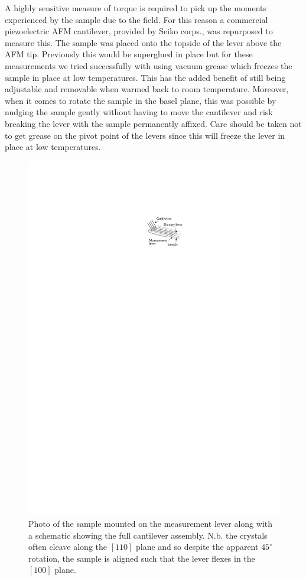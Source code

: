 A highly sensitive measure of torque is required to pick up the moments experienced by the sample due to the field. For this reason a commercial piezoelectric \ac{AFM} cantilever, provided by Seiko corps., was repurposed to measure this. The sample was placed onto the topside of the lever above the \ac{AFM} tip. Previously this would be superglued in place but for these measurements we tried successfully with using vacuum grease which freezes the sample in place at low temperatures. This has the added benefit of still being adjustable and removable when warmed back to room temperature. Moreover, when it comes to rotate the sample in the basel plane, this was possible by nudging the sample gently without having to move the cantilever and risk breaking the lever with the sample permanently affixed. Care should be taken not to get grease on the pivot point of the levers since this will freeze the lever in place at low temperatures.
\begin{figure}[htbp]
    \begin{center}
        \includegraphics[scale=0.9]{Chapter-ExperimentalTechnique/Figures/CantileverSchematic/CantileverSchematic}
        \caption{Photo of the \BaFeP sample mounted on the measurement lever along with a schematic showing the full cantilever assembly. N.b. the \BaFeP crystals often cleave along the $[110]$ plane and so despite the apparent $45^\circ$ rotation, the sample is aligned such that the lever flexes in the $[100]$ plane.}
        \label{Fig:Exp:CantileverSchematic}
    \end{center}
\end{figure}
